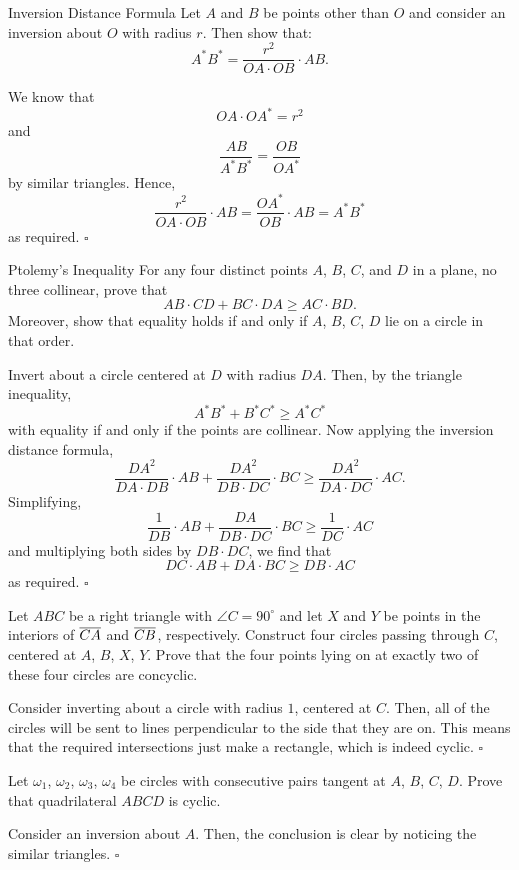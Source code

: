 \documentclass{article}
\begin{document}
\begin{problem}[8.19]{Inversion Distance Formula}
Let $A$ and $B$ be points other than $O$ and consider an inversion about $O$ with radius $r$. Then show that: \[A^*B^* = \dfrac{r^2}{OA \cdot OB} \cdot AB.\]
\end{problem}
We know that \[OA\cdot OA^* = r^2\] and \[\dfrac{AB}{A^*B^*} = \dfrac{OB}{OA^*}\] by similar triangles. Hence, \[\dfrac{r^2}{OA \cdot OB} \cdot AB = \dfrac{OA^*}{OB} \cdot AB = A^*B^*\] as required. $\square$

\begin{problem}[8.20]{Ptolemy's Inequality}
For any four distinct points $A$, $B$, $C$, and $D$ in a plane, no three collinear, prove that \[AB \cdot CD + BC \cdot DA \ge AC \cdot BD.\] Moreover, show that equality holds if and only if $A$, $B$, $C$, $D$ lie on a circle in that order.
\end{problem}
Invert about a circle centered at $D$ with radius $DA$. Then, by the triangle inequality, \[A^*B^*+B^*C^*\ge A^*C^*\] with equality if and only if the points are collinear. Now applying the inversion distance formula, \[\dfrac{DA^2}{DA\cdot DB}\cdot AB + \dfrac{DA^2}{DB\cdot DC}\cdot BC \ge \dfrac{DA^2}{DA\cdot DC}\cdot AC.\] Simplifying, \[\dfrac{1}{DB}\cdot AB + \dfrac{DA}{DB\cdot DC}\cdot BC \ge \dfrac{1}{DC}\cdot AC\] and multiplying both sides by $DB\cdot DC$, we find that \[DC\cdot AB + DA\cdot BC \ge DB\cdot AC\] as required. $\square$

\begin{problem}[8.23]{}
Let $ABC$ be a right triangle with $\angle C = 90^\circ$ and let $X$ and $Y$ be points in the interiors of $\overline{CA}$ and $\overline{CB}$, respectively. Construct four circles passing through $C$, centered at $A$, $B$, $X$, $Y$. Prove that the four points lying on at exactly two of these four circles are concyclic.
\end{problem}
Consider inverting about a circle with radius $1$, centered at $C$. Then, all of the circles will be sent to lines perpendicular to the side that they are on. This means that the required intersections just make a rectangle, which is indeed cyclic. $\square$

\begin{problem}[8.24]{}
Let $\omega_1$, $\omega_2$, $\omega_3$, $\omega_4$ be circles with consecutive pairs tangent at $A$, $B$, $C$, $D$. Prove that quadrilateral $ABCD$ is cyclic.
\end{problem}
Consider an inversion about $A$. Then, the conclusion is clear by noticing the similar triangles. $\square$
\end{document}
